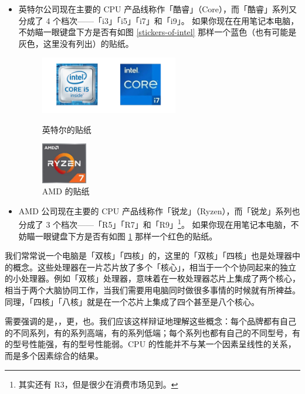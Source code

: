 \begin{itemize}
  \item 英特尔公司现在主要的 CPU 产品线称作「酷睿」（Core），而「酷睿」系列又分成了 4 个档次——「i3」「i5」「i7」和「i9」。
    如果你现在在用笔记本电脑，不妨瞄一眼键盘下方是否有如图 \ref{stickers-of-intel} 那样一个蓝色（也有可能是灰色，这里没有列出）的贴纸。
    \begin{figure}[htb!]
      \centering
      \begin{minipage}{8cm}
        \centering
        \includegraphics[width=6cm]{assets/Stickers_Intel.png}
        \caption{英特尔的贴纸}
        \label{stickers-of-intel}
      \end{minipage}
      \qquad
      \begin{minipage}{5cm}
        \centering
        \includegraphics[width=2cm]{assets/Sticker_AMD.png}
        \caption{AMD 的贴纸}
        \label{sticker-of-amd}
      \end{minipage}
    \end{figure}
  \item AMD 公司现在主要的 CPU 产品线称作「锐龙」（Ryzen），而「锐龙」系列也分成了 3 个档次——「R5」「R7」和「R9」\footnote{其实还有 R3，但是很少在消费市场见到。}。
    如果你现在用笔记本电脑，不妨瞄一眼键盘下方是否有如图 \ref{sticker-of-amd} 那样一个红色的贴纸。
\end{itemize}

我们常常说一个电脑是「双核」「四核」的，这里的「双核」「四核」也是处理器中的概念。这些处理器在一片芯片放了多个「核心」，相当于一个个协同起来的独立的小处理器。例如「双核」处理器，意味着在一枚处理器芯片上集成了两个核心，相当于两个大脑协同工作，当我们需要用电脑同时做很多事情的时候就有所裨益。同理，「四核」「八核」就是在一个芯片上集成了四个甚至是八个核心。

需要强调的是，，更，也。我们应该这样辩证地理解这些概念：每个品牌都有自己的不同系列，有的系列高端，有的系列低端；每个系列也都有自己的不同型号，有的型号性能强，有的型号性能弱。CPU 的性能并不与某一个因素呈线性的关系，而是多个因素综合的结果。

